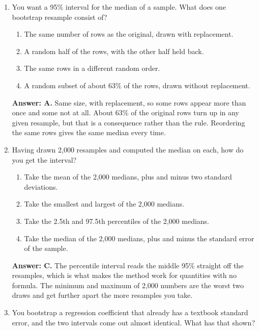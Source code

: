 \documentclass[11pt]{article}
\begin{document}
\begin{enumerate}[itemsep=14pt]
\item You want a 95\% interval for the median of a sample. What does one bootstrap resample consist of?

\begin{enumerate}[label=\Alph*., itemsep=1pt, topsep=3pt]
  \item The same number of rows as the original, drawn with replacement.
  \item A random half of the rows, with the other half held back.
  \item The same rows in a different random order.
  \item A random subset of about 63\% of the rows, drawn without replacement.
\end{enumerate}

\vspace{2pt}
\textbf{Answer: A.} Same size, with replacement, so some rows appear more than once and some not at all. About 63\% of the original rows turn up in any given resample, but that is a consequence rather than the rule. Reordering the same rows gives the same median every time.
\vspace{4pt}

\item Having drawn 2,000 resamples and computed the median on each, how do you get the interval?

\begin{enumerate}[label=\Alph*., itemsep=1pt, topsep=3pt]
  \item Take the mean of the 2,000 medians, plus and minus two standard deviations.
  \item Take the smallest and largest of the 2,000 medians.
  \item Take the 2.5th and 97.5th percentiles of the 2,000 medians.
  \item Take the median of the 2,000 medians, plus and minus the standard error of the sample.
\end{enumerate}

\vspace{2pt}
\textbf{Answer: C.} The percentile interval reads the middle 95\% straight off the resamples, which is what makes the method work for quantities with no formula. The minimum and maximum of 2,000 numbers are the worst two draws and get further apart the more resamples you take.
\vspace{4pt}

\item You bootstrap a regression coefficient that already has a textbook standard error, and the two intervals come out almost identical. What has that shown?


\end{enumerate}
\end{document}
